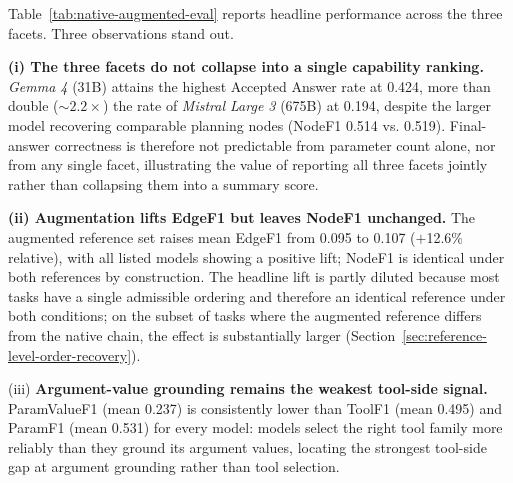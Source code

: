 \documentclass{article}
\providecommand{\model}[1]{\emph{#1}}
\begin{document}
\begin{table}[t]
\caption{Three-facet headline results on Augmented GAIA over $N=165$ tasks per model (1{,}155 total model-task predictions). \emph{Plan Structural Fidelity}: NodeF1 is invariant to reordering by construction (identical under native and augmented references); EdgeF1 is reported under both references with $\Delta$ showing the augmentation lift. \emph{Tool Invocation Accuracy}: ToolF1 / ParamF1 / ParamValueF1 measure correct tool selection, argument-slot prediction, and argument-value grounding (Section~\ref{sec:benchmark-evaluation}). \emph{End-Task Answer Correctness}: EM and TokenF1 are automatic; \emph{Raw rate} is the unprocessed correctness ratio; The \emph{Accepted}$^\ast$ column is the manually adjusted correctness rate
after surface-form review and is the headline final-answer metric used
throughout the experiments.
}
\label{tab:native-augmented-eval}
\end{table}

Table~\ref{tab:native-augmented-eval} reports headline performance across the three facets. 
Three observations stand out. 

\textbf{(i) The three facets do not collapse into a single capability ranking.} \model{Gemma 4} (31B) attains the highest Accepted Answer rate at 0.424, more than double ($\sim 2.2\times$) the rate of \model{Mistral Large 3} (675B) at 0.194, despite the larger model recovering comparable planning nodes (NodeF1 0.514 vs. 0.519). 
Final-answer correctness is therefore not predictable from parameter count alone, nor from any single facet, illustrating the value of reporting all three facets jointly rather than collapsing them into a summary score.

\textbf{(ii) Augmentation lifts EdgeF1 but leaves NodeF1 unchanged.} The augmented reference set raises mean EdgeF1 from 0.095 to 0.107 ($+$12.6\% relative), with all listed models showing a positive lift; NodeF1 is identical under both references by construction. The headline lift is partly diluted because most tasks have a single admissible ordering and therefore an identical reference under both conditions; on the subset of tasks where the augmented reference differs from the native chain, the effect is substantially larger (Section~\ref{sec:reference-level-order-recovery}).

(iii) \textbf{Argument-value grounding remains the weakest tool-side signal.} ParamValueF1 (mean 0.237) is consistently lower than ToolF1 (mean 0.495) and ParamF1 (mean 0.531) for every model: models select the right tool family more reliably than they ground its argument values, locating the strongest tool-side gap at argument grounding rather than tool selection.
\end{document}
